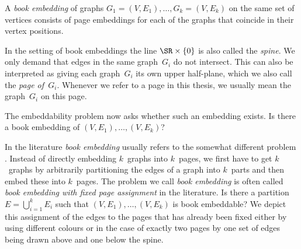 \begin{definition}
\label{def:book-embed}
A \emph{book embedding} of graphs $G_1 = (V, E_1),\dotsc,\allowbreak G_k = (V, E_k)$ on the same set of vertices consists of page embeddings for each of the graphs that coincide in their vertex positions. 

In the setting of book embeddings the line $\SR \times \{0\}$
is also called the \emph{spine}. We only demand that edges in the same
graph~$G_i$ do not intersect. This can also be interpreted as giving each graph~$G_i$ its own upper half-plane, which we also call the \emph{page of~$G_i$}. Whenever we refer to a page in this thesis, we usually
mean the graph~$G_i$ on this page.
\end{definition}

The embeddability problem now asks whether such an embedding exists.
{Is there a book embedding of $(V, E_1),\dotsc, (V, E_k)$?}


In the literature \emph{book embedding} usually refers to the somewhat different problem \probBookNormal. Instead of directly embedding $k$~graphs
into $k$~pages, we first have to get $k$~graphs by arbitrarily partitioning the edges of a graph into 
$k$~parts and then embed these into $k$~pages. The problem
we call \emph{book embedding} is often called \emph{book embedding with fixed page assignment} in the literature. 
{Is there a partition~$E = \bigcup_{i=1}^{k} E_i$ such that $(V, E_1), \dotsc, (V, E_k)$ is book embeddable?}
We depict this
assignment of the edges to the pages that has already been fixed either by using different colours or in the case of exactly two pages by one set of edges being drawn above and one below the spine.